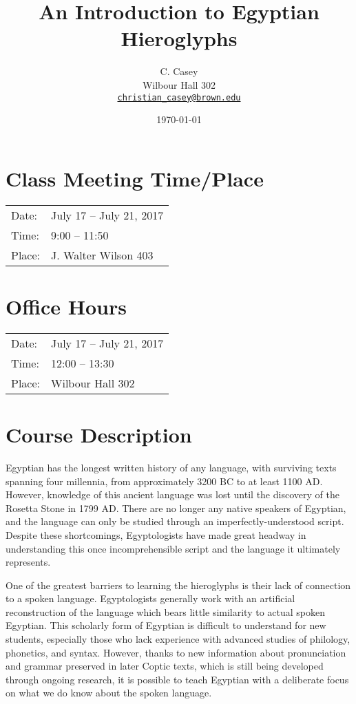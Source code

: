 \documentclass[11pt]{article}
\begin{document}
	
	\title{An Introduction to Egyptian Hieroglyphs}
	\author{C. Casey \\
		Wilbour Hall 302 \\
  		\texttt{\href{mailto:christian_casey@brown.edu}{christian\_casey@brown.edu}}}
	\date{\today}
	\maketitle
	
	\section*{Class Meeting Time/Place}
	
		\begin{tabular}{l l}
		Date: & July 17 -- July 21, 2017 \\
		Time: & 9:00 -- 11:50 \\		%
		Place: & J. Walter Wilson 403		%
		\end{tabular}
		
	\section*{Office Hours}
		\begin{tabular}{l l}
		Date: & July 17 -- July 21, 2017 \\
		Time: & 12:00 -- 13:30 \\					%
		Place: & Wilbour Hall 302
		\end{tabular}
		
	\section*{Course Description}
		Egyptian has the longest written history of any language, with surviving texts spanning four millennia, from approximately 3200 BC to at least 1100 AD. However, knowledge of this ancient language was lost until the discovery of the Rosetta Stone in 1799 AD. There are no longer any native speakers of Egyptian, and the language can only be studied through an imperfectly-understood script. Despite these shortcomings, Egyptologists have made great headway in understanding this once incomprehensible script and the language it ultimately represents. 
	
		One of the greatest barriers to learning the hieroglyphs is their lack of connection to a spoken language. Egyptologists generally work with an artificial reconstruction of the language which bears little similarity to actual spoken Egyptian. This scholarly form of Egyptian is difficult to understand for new students, especially those who lack experience with advanced studies of philology, phonetics, and syntax. However, thanks to new information about pronunciation and grammar preserved in later Coptic texts, which is still being developed through ongoing research, it is possible to teach Egyptian with a deliberate focus on what we do know about the spoken language. 
	
\end{document}
